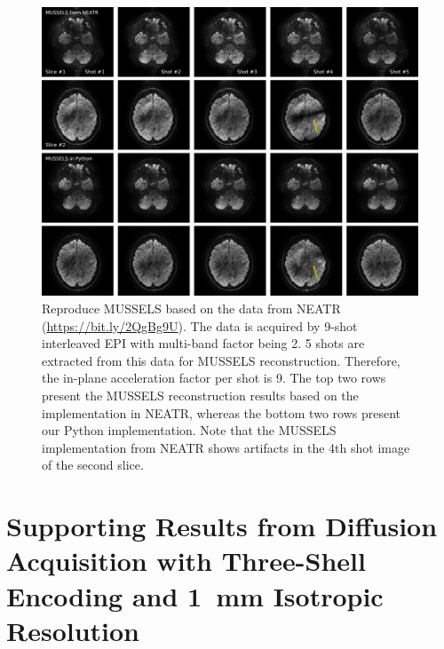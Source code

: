 \documentclass[preprint,12pt,authoryear,review]{elsarticle}
\begin{document}
	\begin{figure}[h!]
		\centering
		\includegraphics[width=\textwidth]{../figures/supp_fig5.png}
		\caption{Reproduce MUSSELS based on the data from NEATR
			(\url{https://bit.ly/2QgBg9U}).
			The data is acquired by 9-shot interleaved EPI with multi-band factor being 2.
			5 shots are extracted from this data for MUSSELS reconstruction.
			Therefore, the in-plane acceleration factor per shot is 9.
			The top two rows present the MUSSELS reconstruction results based on the implementation in NEATR, whereas the bottom two rows present our Python implementation.
			Note that the MUSSELS implementation from NEATR shows artifacts in the 4th shot image of the second slice. }
		\label{FIG:reprod_mussels}
	\end{figure}

	\clearpage

	\section{Supporting Results from Diffusion Acquisition with Three-Shell Encoding and 1~mm Isotropic Resolution}
\end{document}

